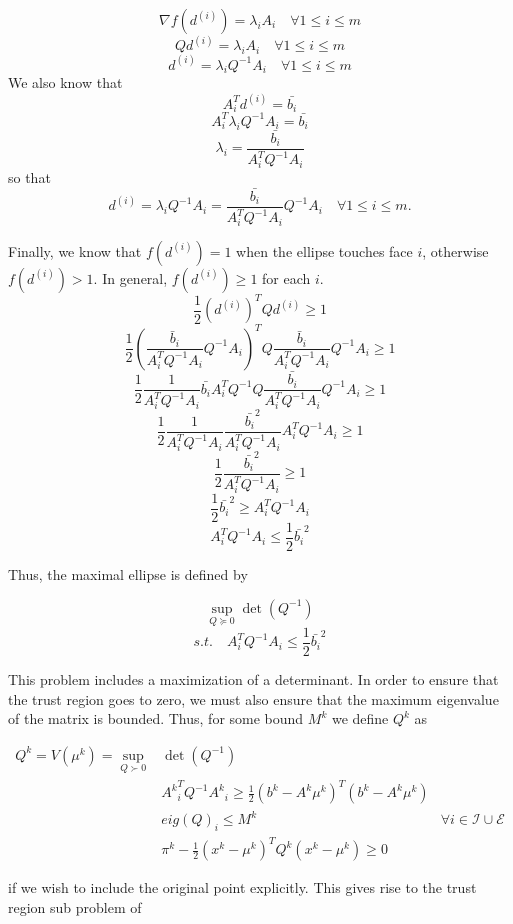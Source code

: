 

\[
\nabla f(d^{(i)}) = \lambda_i A_i \quad \forall 1\le i\le m
\]
\[
Q d^{(i)} = \lambda_i A_i \quad \forall 1\le i\le m
\]
\[
d^{(i)} = \lambda_i Q^{-1}A_i \quad \forall 1\le i\le m
\]
We also know that 
\[
A_i^T d^{(i)} = \bar{b_i}
\]
\[
A_i^T \lambda_i Q^{-1}A_i = \bar{b_i}
\]
\[
\lambda_i = \frac {\bar{b_i}}{A_i^T  Q^{-1}A_i}
\]
so that 
\[
d^{(i)} = \lambda_i Q^{-1}A_i = \frac {\bar{b_i}}{A_i^T  Q^{-1}A_i}  Q^{-1}A_i \quad \forall 1\le i\le m.
\]

Finally, we know that $f(d^{(i)}) = 1$ when the ellipse touches face $i$, otherwise $f(d^{(i)}) > 1$.
In general, $f(d^{(i)}) \ge 1$ for each $i$.
\[
\frac 1 2 (d^{(i)})^{T} Q d^{(i)} \ge 1
\]
\[
\frac 1 2 (\frac {\bar{b}_i}{A_i^T  Q^{-1}A_i}  Q^{-1}A_i)^{T} Q \frac {\bar{b}_i}{A_i^T  Q^{-1}A_i}  Q^{-1}A_i \ge 1
\]
\[
\frac 1 2 \frac {1}{A_i^T  Q^{-1}A_i}  \bar{b_i} A_i^T Q^{-1} Q \frac {\bar{b_i}}{A_i^T  Q^{-1}A_i}  Q^{-1}A_i \ge 1
\]
\[
\frac 1 2 \frac {1}{A_i^T  Q^{-1}A_i}  \frac {\bar{b_i}^2}{A_i^T  Q^{-1}A_i}  A_i^T Q^{-1}A_i \ge 1
\]
\[
\frac 1 2  \frac {\bar{b_i}^2}{A_i^T  Q^{-1}A_i} \ge 1
\]
\[
\frac 1 2 \bar{b_i}^2\ge A_i^T  Q^{-1}A_i
\]
\[
A_i^T  Q^{-1}A_i \le \frac 1 2 \bar{b_i}^2
\]

Thus, the maximal ellipse is defined by

\[
\sup_{Q \succeq 0} \det(Q^{-1})
\]
\[
s.t. \quad A_i^T Q^{-1} A_i \le \frac 1 2 \bar{b_i}^2
\]


This problem includes a maximization of a determinant.
In order to ensure that the trust region goes to zero, we must also ensure that the maximum eigenvalue of the matrix is bounded.
Thus, for some bound $M^k$ we define $Q^k$ as

\begin{center}
\begin{align}
\label{ellipse_1}
Q^k = V(\mu^k) = \sup_{Q \succ 0} & \det(Q^{-1}) & \\
  & {A^k}_i^T Q^{-1} {A^k}_i \ge \frac 1 2 (b^k - A^k\mu^{k})^T(b^k - A^k \mu^{k}) & \\
  & eig(Q)_i \le M^k & \forall i \in \mathcal I \cup \mathcal E \\
  & \pi^k - \frac 1 2 (x^k - \mu^{k})^TQ^{k}(x^k - \mu^{k}) \ge 0
\end{align}
\end{center}

if we wish to include the original point explicitly.
This gives rise to the trust region sub problem of

